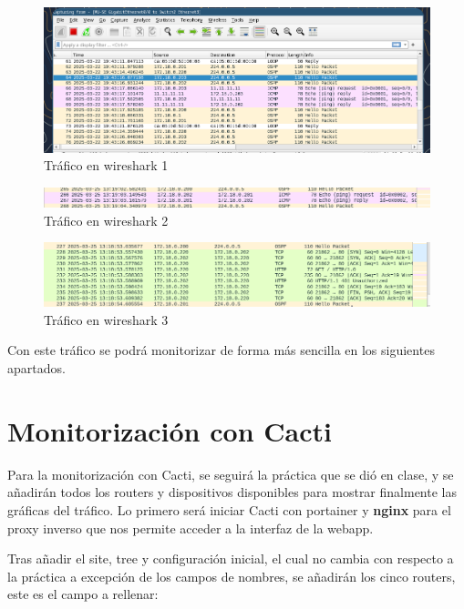\documentclass[11pt]{article}
\begin{document}
\begin{figure}[h]
    \centering
    \includegraphics[width=\textwidth]{src/icmp1.png}
    \caption{Tráfico en wireshark 1}
\end{figure}
\begin{figure}[h]
    \centering
    \includegraphics[width=\textwidth]{src/icmp2.png}
    \caption{Tráfico en wireshark 2}
\end{figure}
\begin{figure}[h]
    \centering
    \includegraphics[width=\textwidth]{src/http1.png}
    \caption{Tráfico en wireshark 3}
\end{figure}


Con este tráfico se podrá monitorizar de forma más sencilla en los siguientes apartados.


\clearpage

\section{Monitorización con Cacti}

Para la monitorización con Cacti, se seguirá la práctica que se dió en clase, y se añadirán todos los routers y dispositivos disponibles para mostrar finalmente las gráficas del tráfico. Lo primero será iniciar Cacti con portainer y \textbf{nginx} para el proxy inverso que nos permite acceder a la interfaz de la webapp.

Tras añadir el site, tree y configuración inicial, el cual no cambia con respecto a la práctica a excepción de los campos de nombres, se añadirán los cinco routers, este es el campo a rellenar:
\end{document}

